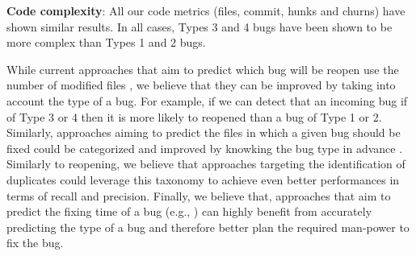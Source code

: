 {\bf Code complexity}: All our code metrics (files, commit, hunks and churns) have shown similar results.
In all cases, Types 3 and 4 bugs have been shown to be more complex than Types 1 and 2 bugs.

While current approaches that aim to predict which bug will be reopen use the number of modified files \cite{Shihab2010,Zimmermann2012,Lo2013}, we believe that they can be improved by taking into account the type of a  bug.
For example, if we can detect that an incoming bug if of Type 3 or 4 then it is more likely to reopened than a bug of Type 1 or 2.
Similarly, approaches aiming to predict the files in which a given bug should be fixed could be categorized and improved by knowking the bug type in advance \cite{Zhou2012,Kim2013a}.
Similarly to reopening, we believe that approaches targeting the identification of
duplicates \cite{Bettenburg2008a,Jalbert2008,Sun2010,Tian2012a}  could leverage this taxonomy to
achieve even better performances in terms of recall and
precision.
Finally, we believe that, approaches that aim to predict the fixing
time of a bug (e.g., \cite{Panjer2007,Bhattacharya2011,Zhang2013}) can highly benefit from
accurately predicting the type of a bug and therefore better
plan the required man-power to fix the bug.

